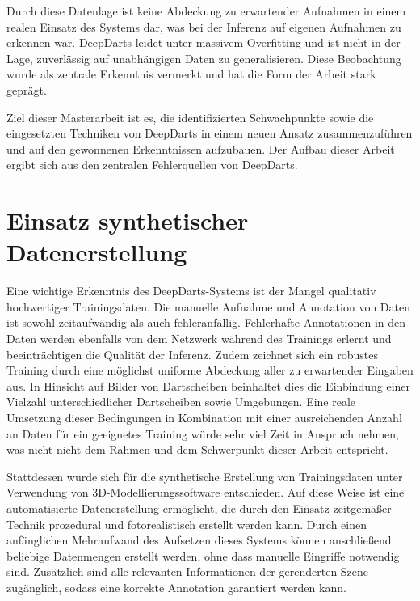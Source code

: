 Durch diese Datenlage ist keine Abdeckung zu erwartender Aufnahmen in einem realen Einsatz des Systems dar, was bei der Inferenz auf eigenen Aufnahmen zu erkennen war. DeepDarts leidet unter massivem Overfitting und ist nicht in der Lage, zuverlässig auf unabhängigen Daten zu generalisieren. Diese Beobachtung wurde als zentrale Erkenntnis vermerkt und hat die Form der Arbeit stark geprägt.

Ziel dieser Masterarbeit ist es, die identifizierten Schwachpunkte sowie die eingesetzten Techniken von DeepDarts in einem neuen Ansatz zusammenzuführen und auf den gewonnenen Erkenntnissen aufzubauen. Der Aufbau dieser Arbeit ergibt sich aus den zentralen Fehlerquellen von DeepDarts.




\section{Einsatz synthetischer Datenerstellung}
\label{sec:warum_daten}

Eine wichtige Erkenntnis des DeepDarts-Systems ist der Mangel qualitativ hochwertiger Trainingsdaten. Die manuelle Aufnahme und Annotation von Daten ist sowohl zeitaufwändig als auch fehleranfällig. Fehlerhafte Annotationen in den Daten werden ebenfalls von dem Netzwerk während des Trainings erlernt und beeinträchtigen die Qualität der Inferenz. Zudem zeichnet sich ein robustes Training durch eine möglichst uniforme Abdeckung aller zu erwartender Eingaben aus. In Hinsicht auf Bilder von Dartscheiben beinhaltet dies die Einbindung einer Vielzahl unterschiedlicher Dartscheiben sowie Umgebungen. Eine reale Umsetzung dieser Bedingungen in Kombination mit einer ausreichenden Anzahl an Daten für ein geeignetes Training würde sehr viel Zeit in Anspruch nehmen, was nicht nicht dem Rahmen und dem Schwerpunkt dieser Arbeit entspricht.

Stattdessen wurde sich für die synthetische Erstellung von Trainingsdaten unter Verwendung von 3D-Modellierungssoftware entschieden. Auf diese Weise ist eine automatisierte Datenerstellung ermöglicht, die durch den Einsatz zeitgemäßer Technik prozedural und fotorealistisch erstellt werden kann. Durch einen anfänglichen Mehraufwand des Aufsetzen dieses Systems können anschließend beliebige Datenmengen erstellt werden, ohne dass manuelle Eingriffe notwendig sind. Zusätzlich sind alle relevanten Informationen der gerenderten Szene zugänglich, sodass eine korrekte Annotation garantiert werden kann.

